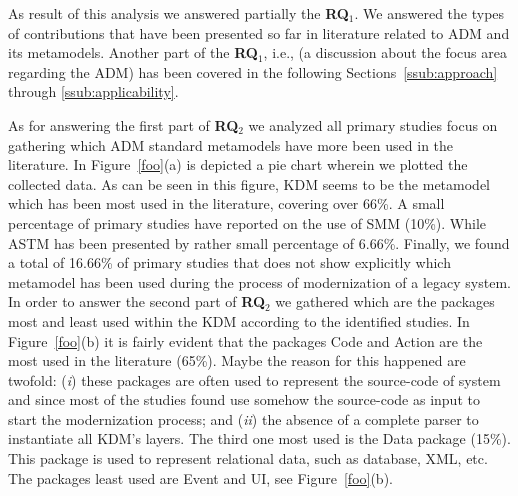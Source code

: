 % 
 


 As result of this analysis we answered partially the \textbf{RQ$_1$}. We answered the types of contributions that have been presented so far in literature related to ADM and its metamodels. Another part of the \textbf{RQ$_1$}, i.e., (a discussion about the focus area regarding the ADM) has been covered in the following Sections~\ref{ssub:approach} through \ref{ssub:applicability}. %

As for answering the first part of \textbf{RQ$_2$} we analyzed all primary studies focus on gathering which ADM standard metamodels have more been used in the literature. In Figure~\ref{foo}(a) is depicted a pie chart wherein we plotted the collected data. As can be seen in this figure, KDM seems to be the metamodel which has been most used in the literature, covering over 66\%. A small percentage of primary studies have reported on the use of SMM (10\%). While ASTM has been presented by rather small percentage of 6.66\%. Finally, we found a total of 16.66\% of primary studies that does not show explicitly which metamodel has been used during the process of modernization of a legacy system. In order to answer the second part of \textbf{RQ$_2$} we gathered which are the packages most and least used within the KDM according to the identified studies. In Figure~\ref{foo}(b) it is fairly evident that the packages Code and Action are the most used in the literature (65\%). Maybe the reason for this happened are twofold: (\textit{i}) these packages are often used to represent the source-code of system and since most of the studies found use somehow the source-code as input to start the modernization process; and (\textit{ii}) the absence of a complete parser to instantiate all KDM's layers. The third one most used is the Data package (15\%). This package is used to represent relational data, such as database, XML, etc. The packages least used are Event and UI, see Figure~\ref{foo}(b). 

